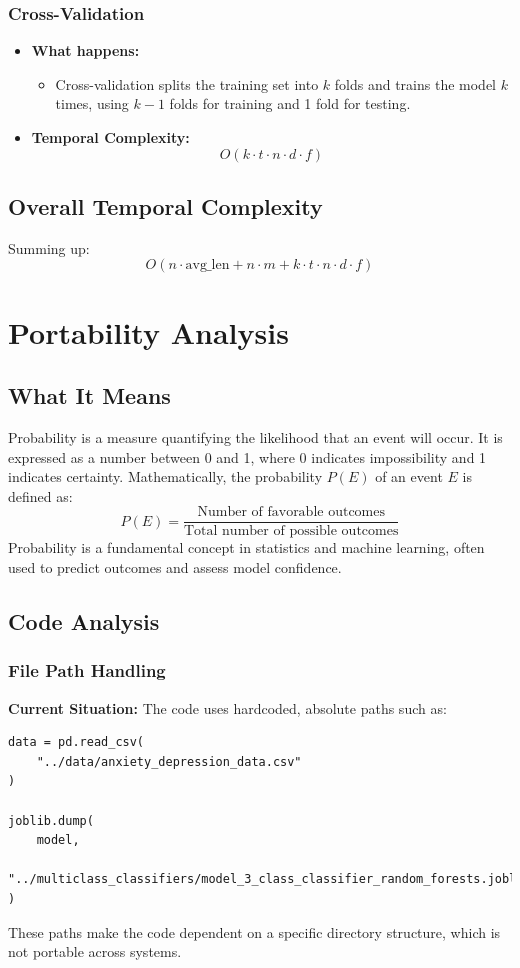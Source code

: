 \documentclass[runningheads,a4paper,11pt]{report}
\begin{document}
\subsubsection{Cross-Validation}
\label{section:cross-validation}
\begin{itemize}
  \item \textbf{What happens:}
  \begin{itemize}
    \item Cross-validation splits the training set into $k$ folds and trains the model $k$ times, using $k-1$ folds for training and 1 fold for testing.
  \end{itemize}
  \item \textbf{Temporal Complexity:}
  \[
  O(k \cdot t \cdot n \cdot d \cdot f)
  \]
\end{itemize}

\subsection{Overall Temporal Complexity}
\label{section:overall-temporal}
Summing up:
\[
O(n \cdot \text{avg\_len} + n \cdot m + k \cdot t \cdot n \cdot d \cdot f)
\]


\section{Portability Analysis}
\label{section:portability-analysis}

\subsection{What It Means}
Probability is a measure quantifying the likelihood that an event will occur. It is expressed as a number between 0 and 1, where 0 indicates impossibility and 1 indicates certainty. Mathematically, the probability \( P(E) \) of an event \( E \) is defined as:
\[
P(E) = \frac{\text{Number of favorable outcomes}}{\text{Total number of possible outcomes}}
\]
Probability is a fundamental concept in statistics and machine learning, often used to predict outcomes and assess model confidence.

\subsection{Code Analysis}
\label{section:code_analysis}

\subsubsection{File Path Handling}
\label{section:file-path-handaling}
\textbf{Current Situation:} The code uses hardcoded, absolute paths such as:
\begin{verbatim}
data = pd.read_csv(
    "../data/anxiety_depression_data.csv"
)

joblib.dump(
    model, 
    "../multiclass_classifiers/model_3_class_classifier_random_forests.joblib"
)
\end{verbatim}
These paths make the code dependent on a specific directory structure, which is not portable across systems.
\end{document}
